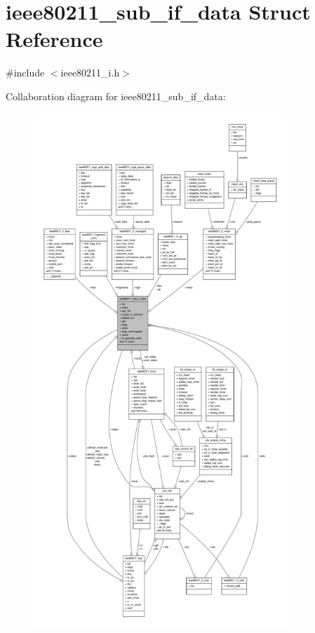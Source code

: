 \hypertarget{structieee80211__sub__if__data}{\section{ieee80211\-\_\-sub\-\_\-if\-\_\-data Struct Reference}
\label{structieee80211__sub__if__data}
}


{\ttfamily \#include $<$ieee80211\-\_\-i.\-h$>$}



Collaboration diagram for ieee80211\-\_\-sub\-\_\-if\-\_\-data\-:
\nopagebreak
\begin{figure}[H]
\begin{center}
\leavevmode
\includegraphics[height=550pt]{structieee80211__sub__if__data__coll__graph}
\end{center}
\end{figure}
